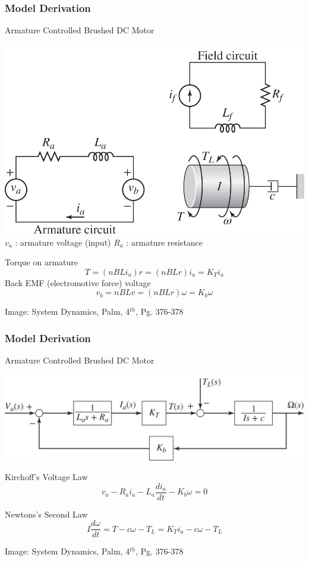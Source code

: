 \documentclass{beamer}                  %
\newcommand{\sectiontitleII}{Model Derivation}
\begin{document}
	\begin{frame}[label=sectionII,containsverbatim] \small
        \frametitle{\sectiontitleII}
		Armature Controlled Brushed DC Motor \vspc

		\begin{multicols}{2}

		\includegraphics[scale=.70]{paL40056_06_05_04_cropped.png}\vspace{5mm}\\

		\small
		$v_a$ : armature voltage (input)\vspc
        $R_a$ : armature resistance

        Torque on armature
        \[T=\left(nBLi_a \right)r=\left(nBLr\right)i_a=K_Ti_a \] 
        Back EMF (electromotive force) voltage
        \[v_b=nBLv=\left(nBLr\right)\omega=K_b\omega \]	

        \end{multicols}

		\btVFill
		\tiny{Image: System Dynamics, Palm, 4$^{th}$, Pg. 376-378}
		
	\end{frame}

	\begin{frame}[label=sectionII,containsverbatim] \small
        \frametitle{\sectiontitleII}
		Armature Controlled Brushed DC Motor \vspc

		\includegraphics[scale=.65]{paL40056_06_05_05_cropped.png}

        Kirchoff's Voltage Law 
        \[ v_a-R_ai_a-L_a\frac{di_a}{dt}-K_b\omega=0 \] 

        Newtons's Second Law  
        \[ I\frac{d\omega}{dt}=T-c\omega-T_L=K_Ti_a-c\omega-T_L \]	

		\btVFill
		\tiny{Image: System Dynamics, Palm, 4$^{th}$, Pg. 376-378}
		
	\end{frame}	
\end{document}
